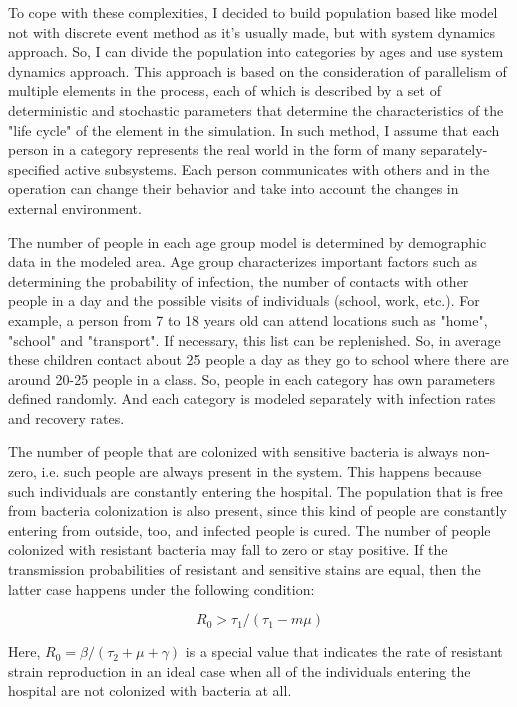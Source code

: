 To cope with these complexities, I decided to build population based like model not with discrete event method as it’s usually made, but with system dynamics approach. So, I can divide the population into categories by ages and use system dynamics approach. This approach is based on the consideration of parallelism of multiple elements in the process, each of which is described by a set of deterministic and stochastic parameters that determine the characteristics of the "life cycle" of the element in the simulation. In such method, I assume that each person in a category represents the real world in the form of many separately-specified active subsystems. Each person communicates with others and in the operation can change their behavior and take into account the changes in external environment.

The number of people in each age group model is determined by demographic data in the modeled area. Age group characterizes important factors such as determining the probability of infection, the number of contacts with other people in a day and the possible visits of individuals (school, work, etc.). For example, a person from 7 to 18 years old can attend locations such as "home", "school" and "transport". If necessary, this list can be replenished. So, in average these children contact about 25 people a day as they go to school where there are around 20-25 people in a class.  So, people in each category has own parameters defined randomly. And each category is modeled separately with infection rates and recovery rates.

The number of people that are colonized with sensitive bacteria is always non-zero, i.e. such people are always present in the system. This happens because such individuals are constantly entering the hospital. The population that is free from bacteria colonization is also present, since this kind of people are constantly entering from outside, too, and infected people is cured. The number of people colonized with resistant bacteria may fall to zero or stay positive. If the transmission probabilities of resistant and sensitive stains are equal, then the latter case happens under the following condition:

\begin{equation}
R_0 > \tau_1/(\tau_1 - m \mu)
\end{equation}

Here, $R_0 = \beta/(\tau_2 + \mu + \gamma)$ is a special value that indicates the rate of resistant strain reproduction in an ideal case when all of the individuals entering the hospital are not colonized with bacteria at all.

